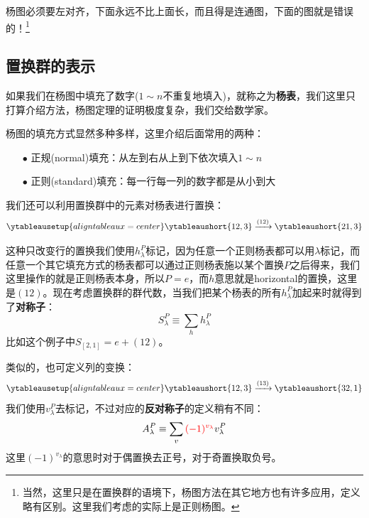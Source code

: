 杨图必须要左对齐，下面永远不比上面长，而且得是连通图，下面的图就是{\color{red}错误的！}\footnote{当然，这里只是在置换群的语境下，杨图方法在其它地方也有许多应用，定义略有区别。这里我们考虑的实际上是正则杨图。}
\begin{center}
	\qquad{}\qquad{}
\end{center}

\subsection{置换群的表示}
如果我们在杨图中填充了数字($1\sim n$不重复地填入)，就称之为\textbf{杨表}，我们这里只打算介绍方法，杨图定理的证明极度复杂，我们交给数学家。

杨图的填充方式显然多种多样，这里介绍后面常用的两种：
\begin{itemize}
	\item[$\bullet$] 正规(normal)填充：从左到右从上到下依次填入$1\sim n$
	\begin{center}
		\qquad{}\qquad{}
	\end{center}
	\item[$\bullet$] 正则(standard)填充：每一行每一列的数字都是从小到大
	\begin{center}
		\qquad{}\qquad {}\qquad{}
	\end{center}
\end{itemize}

我们还可以利用置换群中的元素对杨表进行置换：
\begin{equation*}
	\ytableausetup{aligntableaux=center}
	\ytableaushort{12,3}\xrightarrow{{(12)}}	\ytableaushort{21,3}
\end{equation*}

这种只改变行的置换我们使用$h^P_\lambda$标记，因为任意一个正则杨表都可以用$\lambda$标记，而任意一个其它填充方式的杨表都可以通过正则杨表施以某个置换$P$之后得来，我们这里操作的就是正则杨表本身，所以$P=e$，而$h$意思就是horizontal的置换，这里是$(12)$。现在考虑置换群的群代数，当我们把某个杨表的所有$h^P_\lambda$加起来时就得到了\textbf{对称子}：
\begin{equation}
	S_\lambda^P\equiv\sum_h h^P_\lambda
\end{equation}
比如这个例子中$S_{[2,1]}=e+(12)$。

类似的，也可定义列的变换：
\begin{equation*}
	\ytableausetup{aligntableaux=center}
	\ytableaushort{12,3}\xrightarrow{{(13)}}	\ytableaushort{32,1}
\end{equation*}
我们使用$v^{P}_\lambda$去标记，不过对应的\textbf{反对称子}的定义稍有不同：
\begin{equation}
	A_\lambda^P\equiv\sum_v {\color{red}(-1)^{v_\lambda}}v^P_\lambda
\end{equation}
这里$(-1)^{v_\lambda}$的意思时对于偶置换去正号，对于奇置换取负号。

